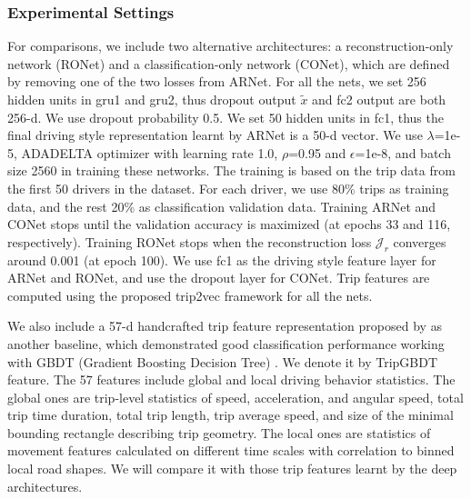 \documentclass{article}
\begin{document}
\subsubsection{Experimental Settings}
For comparisons, we include two alternative architectures: a reconstruction-only network (RONet) and a classification-only network (CONet), %
which are defined by removing one of the two losses from ARNet. %
For all the nets, we set 256 hidden units in gru1 and gru2, thus dropout output $\tilde{x}$ and fc2 output are both 256-d.
We use dropout probability 0.5.
We set 50 hidden units in fc1, thus the final driving style representation learnt by ARNet is a 50-d vector.
We use $\lambda$=1e-5, ADADELTA optimizer \cite{zeiler2012adadelta} with learning rate 1.0, $\rho$=0.95 and $\epsilon$=1e-8, and batch size 2560 in training these networks.
The training is based on the trip data from the first 50 drivers in the dataset.
For each driver, we use 80\% trips as training data, and the rest 20\% as classification validation data.
Training ARNet and CONet stops until the %
validation accuracy is maximized (at epochs 33 and 116, respectively).
Training RONet stops when the reconstruction loss $\mathcal{J}_r$ converges around 0.001
(at epoch 100).
We use fc1 as the driving style feature layer for ARNet and RONet, and use the dropout layer for CONet.
Trip features are computed using the proposed trip2vec framework %
for all the nets.

We also include a 57-d handcrafted trip feature representation proposed by \cite{dong2016characterizing} as another baseline, which demonstrated good classification performance working with GBDT (Gradient Boosting Decision Tree) \cite{friedman2001greedy}.
We denote it by TripGBDT feature.
The 57 features include global and local driving behavior statistics.
The global ones are trip-level statistics of speed, acceleration, and angular speed, total trip time duration, total trip length, trip average speed, and size of the minimal bounding rectangle describing trip geometry.
The local ones are statistics of movement features calculated on different time scales with correlation to binned local road shapes.
We will compare it with those trip features learnt by the deep architectures.
\end{document}
